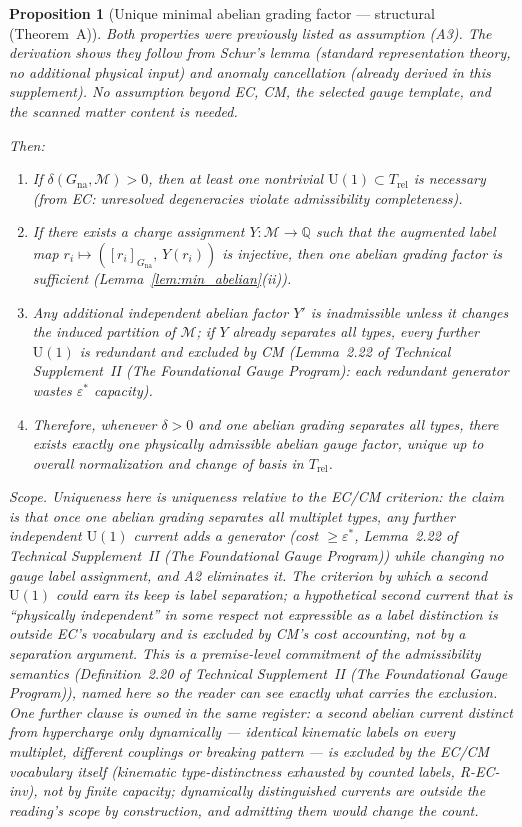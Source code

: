 \documentclass[11pt]{article}
\newtheorem{proposition}[theorem]{Proposition}
\theoremstyle{definition}
\newcommand{\U}{\mathrm{U}}
\newcommand{\TSII}{Technical Supplement~II (\emph{The Foundational Gauge Program})}
\begin{document}
\begin{proposition}[Unique minimal abelian grading factor ---
structural (Theorem~A)]
\noindent Both properties were previously listed as assumption (A3).
The derivation shows they follow from Schur's lemma (standard
representation theory, no additional physical input) and anomaly
cancellation (already derived in this supplement).  No assumption
beyond EC, CM, the selected gauge template, and the scanned matter
content is needed.

Then:
\begin{enumerate}[label=(\roman*),nosep]
  \item If $\delta(G_{\mathrm{na}}, \mathcal{M}) > 0$, then at
  least one nontrivial $\U(1) \subset T_{\mathrm{rel}}$ is necessary
  (from EC: unresolved degeneracies violate admissibility completeness).
  \item If there exists a charge assignment $Y: \mathcal{M} \to \mathbb{Q}$
  such that the augmented label map
  $r_i \mapsto ([r_i]_{G_{\mathrm{na}}},\, Y(r_i))$
  is injective, then one abelian grading factor is sufficient
  (Lemma~\ref{lem:min_abelian}(ii)).
  \item Any additional independent abelian
  factor $Y'$ is inadmissible unless it changes the induced partition of
  $\mathcal{M}$; if $Y$ already separates all types, every further
  $\U(1)$ is redundant and excluded by CM
  (Lemma~2.22 of \TSII{}: each redundant generator wastes
  $\varepsilon^*$ capacity).
  \item Therefore, whenever $\delta > 0$ and one abelian grading
  separates all types, there exists exactly one physically admissible
  abelian gauge factor, unique up to overall normalization and change
  of basis in $T_{\mathrm{rel}}$.
\end{enumerate}
\emph{Scope.}  Uniqueness here is uniqueness \emph{relative to the
EC/CM criterion}: the claim is that once one abelian grading separates
all multiplet types, any further independent $\U(1)$ current adds a
generator (cost $\ge \varepsilon^*$, Lemma~2.22 of \TSII{})
while changing no gauge label assignment, and A2 eliminates it.  The
criterion by which a second $\U(1)$ could earn its keep is label
separation; a hypothetical second current that is ``physically
independent'' in some respect not expressible as a label distinction
is outside EC's vocabulary and is excluded by CM's cost accounting,
not by a separation argument.  This is a premise-level commitment of
the admissibility semantics (Definition~2.20 of \TSII{}),
named here so the reader can see exactly what carries the exclusion.
One further clause is owned in the same register: a second abelian
current distinct from hypercharge only \emph{dynamically} --- identical
kinematic labels on every multiplet, different couplings or breaking
pattern --- is excluded by the EC/CM vocabulary itself (kinematic
type-distinctness exhausted by counted labels, R-EC-inv), not by
finite capacity; dynamically distinguished currents are outside the
reading's scope by construction, and admitting them would change the
count.
\end{proposition}
\end{document}
